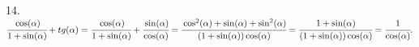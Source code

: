 14. $\cfrac{\cos(\alpha)}{1+\sin(\alpha)}+tg(\alpha)=\cfrac{\cos(\alpha)}{1+\sin(\alpha)}+\cfrac{\sin(\alpha)}{\cos(\alpha)}=
\cfrac{\cos^2(\alpha)+\sin(\alpha)+\sin^2(\alpha)}{(1+\sin(\alpha))\cos(\alpha)}=\cfrac{1+\sin(\alpha)}{(1+\sin(\alpha))\cos(\alpha)}=\cfrac{1}{\cos(\alpha)}.$\\
